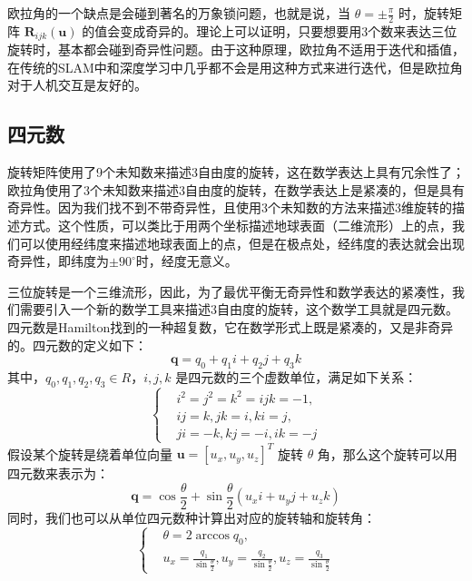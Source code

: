欧拉角的一个缺点是会碰到著名的万象锁问题\cite{vsenk2006rotation}，也就是说，当 $\theta = \pm \frac{\pi}{2}$ 时，旋转矩阵 $\boldsymbol{R}_{ijk}(\boldsymbol{u})$ 的值会变成奇异的。理论上可以证明，只要想要用3个数来表达三位旋转时，基本都会碰到奇异性问题\cite{stuelpnagel1964parametrization}。由于这种原理，欧拉角不适用于迭代和插值，在传统的SLAM中和深度学习中几乎都不会是用这种方式来进行迭代，但是欧拉角对于人机交互是友好的。

\subsection{四元数}
旋转矩阵使用了9个未知数来描述3自由度的旋转，这在数学表达上具有冗余性了；欧拉角使用了3个未知数来描述3自由度的旋转，在数学表达上是紧凑的，但是具有奇异性。因为我们找不到不带奇异性，且使用3个未知数的方法来描述3维旋转的描述方式\cite{stuelpnagel1964parametrization}。这个性质，可以类比于用两个坐标描述地球表面（二维流形）上的点，我们可以使用经纬度来描述地球表面上的点，但是在极点处，经纬度的表达就会出现奇异性，即纬度为$\pm 90^{\circ}$时，经度无意义。

三位旋转是一个三维流形，因此，为了最优平衡无奇异性和数学表达的紧凑性，我们需要引入一个新的数学工具来描述3自由度的旋转，这个数学工具就是四元数。四元数是Hamilton找到的一种超复数，它在数学形式上既是紧凑的，又是非奇异的。四元数的定义如下：
\begin{equation}
    \boldsymbol{q} = q_0 + q_1 i + q_2 j + q_3 k
\end{equation}
其中，$q_0, q_1, q_2, q_3 \in R$，$i, j, k$ 是四元数的三个虚数单位，满足如下关系：
\begin{equation}
    \left\{
    \begin{aligned}
        &i^2 = j^2 = k^2 = ijk = -1, \\
        &ij = k, jk = i, ki = j, \\
        &ji = -k, kj = -i, ik = -j
    \end{aligned}
    \right.
\end{equation}
假设某个旋转是绕着单位向量 $\boldsymbol{u} = [u_x, u_y, u_z]^T$ 旋转 $\theta$ 角，那么这个旋转可以用四元数来表示为：
\begin{equation}
    \boldsymbol{q} = \cos \frac{\theta}{2} + \sin \frac{\theta}{2} (u_x i + u_y j + u_z k)
\end{equation}
同时，我们也可以从单位四元数种计算出对应的旋转轴和旋转角：
\begin{equation}
    \left\{
    \begin{aligned}
        &\theta = 2 \arccos q_0, \\
        &u_x = \frac{q_1}{\sin \frac{\theta}{2}}, u_y = \frac{q_2}{\sin \frac{\theta}{2}}, u_z = \frac{q_3}{\sin \frac{\theta}{2}}
    \end{aligned}
    \right.
\end{equation}

